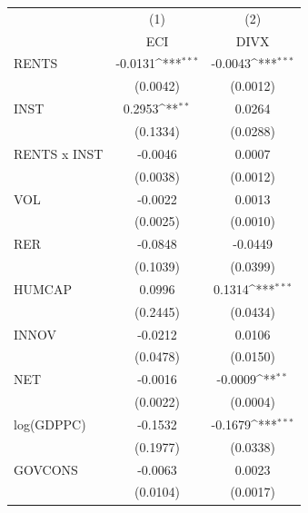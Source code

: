 {
\def\sym#1{\ifmmode^{#1}\else\(^{#1}\)\fi}
\begin{tabular}{l*{2}{c}}
\toprule
                    &\multicolumn{1}{c}{(1)}&\multicolumn{1}{c}{(2)}\\
                    &\multicolumn{1}{c}{ECI}&\multicolumn{1}{c}{DIVX}\\
\midrule
RENTS               &     -0.0131\sym{***}&     -0.0043\sym{***}\\
                    &    (0.0042)         &    (0.0012)         \\
\addlinespace
INST                &      0.2953\sym{**} &      0.0264         \\
                    &    (0.1334)         &    (0.0288)         \\
\addlinespace
RENTS x INST        &     -0.0046         &      0.0007         \\
                    &    (0.0038)         &    (0.0012)         \\
\addlinespace
VOL                 &     -0.0022         &      0.0013         \\
                    &    (0.0025)         &    (0.0010)         \\
\addlinespace
RER                 &     -0.0848         &     -0.0449         \\
                    &    (0.1039)         &    (0.0399)         \\
\addlinespace
HUMCAP              &      0.0996         &      0.1314\sym{***}\\
                    &    (0.2445)         &    (0.0434)         \\
\addlinespace
INNOV               &     -0.0212         &      0.0106         \\
                    &    (0.0478)         &    (0.0150)         \\
\addlinespace
NET                 &     -0.0016         &     -0.0009\sym{**} \\
                    &    (0.0022)         &    (0.0004)         \\
\addlinespace
log(GDPPC)          &     -0.1532         &     -0.1679\sym{***}\\
                    &    (0.1977)         &    (0.0338)         \\
\addlinespace
GOVCONS             &     -0.0063         &      0.0023         \\
                    &    (0.0104)         &    (0.0017)         \\

\end{tabular}}
